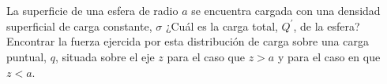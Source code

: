 \documentclass[./../main.tex]{subfiles}
\begin{document}
    \section{}

    La superficie de una esfera de radio \(a\) se encuentra cargada con una densidad superficial de carga constante, \(\sigma\) ¿Cuál es la carga total, \(Q^{\prime}\), de la esfera? Encontrar la fuerza ejercida por esta distribución de carga sobre una carga puntual, \(q\), situada sobre el eje \(z\) para el caso que \(z > a\) y para el caso en que \(z < a\).
\end{document}
